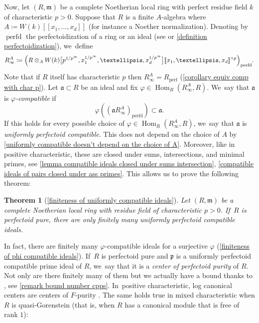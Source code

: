 \documentclass[11pt]{article}
\let\autoref\cref
\theoremstyle{plain}
\newtheorem{mainthm}{Theorem}
\theoremstyle{definition}
\numberwithin{equation}{theorem}
\let\tensor\otimes
\newcommand{\fra}{\mathfrak{a}}
\newcommand{\fram}{\mathfrak{m}}
\newcommand{\p}{\mathfrak{p}}
\DeclareMathOperator{\Hom}{Hom}
\DeclareMathOperator{\perfdd}{perfd}
\newcommand{\perfd}{_{\mathrm{perfd}}}
\newcommand{\perf}{_{\mathrm{perf}}}
\newcommand{\llbracket}{[\![}
\newcommand{\rrbracket}{]\!]}
\renewcommand{\phi}{\varphi}
\newcommand{\unpfty}{{1/p^\infty}}
\newcommand{\rafty}{R^A_\infty}
\begin{document}
Now, let $(R,\fram)$ be a complete Noetherian local ring with perfect residue field $k$ of characteristic $p>0$. Suppose that $R$ is a finite $A$-algebra where
$A\coloneqq W(k)\llbracket x_1,\ldots,x_d \rrbracket $ (for instance a Noether normalization). Denoting by $\perfdd$ the perfectoidization of a ring or an ideal (see \cite[\S 10]{BhattScholzePrisms} or \autoref{definition perfectoidization}), we~define
\[
\rafty\coloneqq \Bigl(R\tensor_A W(k)\bigl[p^\unpfty,x_1^\unpfty, \ldots,x_d^\unpfty\bigr]\llbracket x_1,\ldots,x_d\rrbracket^{\wedge p}\Bigr)\perfd.
\]
Note that if $R$ itself has characteristic $p$ then $\rafty=R\perf$ (\autoref{corollary equiv comp with char p}). Let $\fra\subset R$ be an ideal and fix $\phi\in \Hom_R(\rafty,R)$. We~say that $\fra$ is \emph{$\phi$-compatible} if
\[\phi\left(\left (\fra\rafty\right)\perfd \right) \subset \fra.
\]
If this holds for every possible choice of $\phi\in \Hom_R(\rafty,R)$, we~say that $\fra$ is \emph{uniformly perfectoid compatible}. This does not depend on the choice of $A$ by \autoref{uniformly compatible doesn't depend on the choice of A}. Moreover, like in positive characteristic, these are closed under sums, intersections, and minimal primes, see \autoref{lemma compatible ideals closed under sums intersection}, \autoref{compatible ideals of pairs closed under ass primes}. This allows us to prove the following theorem:

\begin{mainthm}[{\autoref{finiteness of uniformly compatible ideals}}]
Let $(R,\fram)$ be a complete Noetherian local ring with residue field of characteristic $p>0$. If~$R$ is perfectoid pure, there are only finitely many uniformly perfectoid compatible ideals.
\end{mainthm}

In fact, there are finitely many $\phi$-compatible ideals for a surjective $\phi$ (\autoref{finiteness of phi compatible ideals}). If~$R$ is perfectoid pure and $\p$ is a uniformly perfectoid compatible prime ideal of $R$, we~say that it is a \emph{center of perfectoid purity} of $R$. Not only are there finitely many of them but we actually have a bound thanks to \cite{SchwedeTuckerNumberOfFSplit}, see \autoref{remark bound number cpps}. In~positive characteristic, log canonical centers are centers of $F$-purity \cite{SchwedeCentersOfFPurity}. The same holds true in mixed characteristic when $R$ is quasi-Gorenstein (that is, when $R$ has a canonical module that is free of rank $1$):
\end{document}
